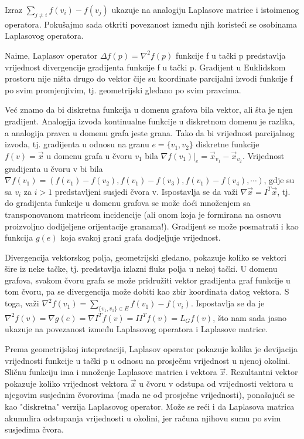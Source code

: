 \documentclass[11pt]{article}
\begin{document}
	Izraz $\sum_{ j \neq i}  f(v_i) - f(v_j)$ ukazuje na analogiju Laplasove matrice i istoimenog operatora.
	Pokušajmo sada otkriti povezanost između njih koristeći se osobinama Laplasovog operatora.

	Naime, Laplasov operator $\Delta f(p) = \nabla^2 f(p)$ funkcije f u tački p predstavlja vrijednost divergencije gradijenta funkcije f u tački p.
	Gradijent u Euklidskom prostoru nije ništa drugo do vektor čije su koordinate parcijalni izvodi funkcije f po svim promjenjivim, tj. geometrijski gledano po svim pravcima.
	
	Već znamo da bi diskretna funkcija u domenu grafova bila vektor, ali šta je njen gradijent. 
	Analogija izvoda kontinualne funkcije u diskretnom domenu je razlika, a analogija pravca u domenu grafa jeste grana. 
	Tako da bi vrijednost parcijalnog izvoda, tj. gradijenta u odnosu na granu $e=\{v_1,v_2\}$ diskretne funkcije $f(v) = \vec{x}$ u domenu grafa u čvoru $v_1$ bila $\nabla  f(v_1)|_e = \vec{x}_{v_1} - \vec{x}_{v_2}$.
	Vrijednost gradijenta u čvoru v bi bila $\nabla f(v_1) = (f(v_1) - f(v_2),f(v_1) - f(v_3),f(v_1) - f(v_4), \cdots)$, gdje su sa $v_i$ za $i>1$ predstavljeni susjedi čvora v.
	Ispostavlja se da važi $\nabla \vec{x} = I^T \vec{x}$, tj. do gradijenta funkcije u domenu grafova se može doći množenjem sa transponovanom matricom incidencije (ali onom koja je formirana na osnovu proizvoljno dodijeljene orijentacije granama!).
	Gradijent se može posmatrati i kao funkcija $g(e)$ koja svakoj grani grafa dodjeljuje vrijednost.
	
	Divergencija vektorskog polja, geometrijski gledano, pokazuje koliko se vektori šire iz neke tačke, tj. predstavlja izlazni fluks polja u nekoj tački.
	U domenu grafova, svakom čvoru grafa se može pridružiti vektor gradijenta graf funkcije u tom čvoru, pa se divergencija može dobiti kao zbir koordinata datog vektora.
	S toga, važi $\nabla^2 f(v_1) = \sum_{ \{v_1,v_1\} \in E} f(v_1) - f(v_i)$.
	Ispostavlja se da je $\nabla^2 f(v) = \nabla g(e) = \nabla I^T f(v) = I I^T f(v) = L_G f(v)$, što nam sada jasno ukazuje na povezanost između Laplasovog operatora i Laplasove matrice.

	Prema geometrijskoj intepretaciji, Laplasov operator pokazuje kolika je devijacija vrijednosti funkcije u tački p u odnosu na prosječnu vrijednost u njenoj okolini.
	Sličnu funkciju ima i množenje Laplasove matrica i vektora $\vec{x}$. Rezultantni vektor pokazuje koliko vrijednost vektora $\vec{x}$ u čvoru v odstupa od vrijednosti
	vektora u njegovim susjednim čvorovima (mada ne od prosječne vrijednosti), ponašajući se kao "diskretna" verzija Laplasovog operator. 
	Može se reći i da Laplasova matrica akumulira odstupanja vrijednosti u okolini, jer računa njihovu sumu po svim susjedima čvora.
\end{document}
